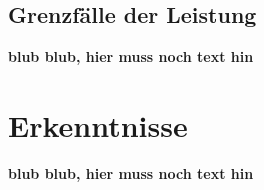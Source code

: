 \documentclass[
a4paper,     %
 headsepline, %
11pt         %
]{scrartcl}  %
\begin{document}
\subsection{Grenzfälle der Leistung}
\textbf{blub blub, hier muss noch text hin}


\section{Erkenntnisse}
\textbf{blub blub, hier muss noch text hin}



% 

% 
\end{document}
